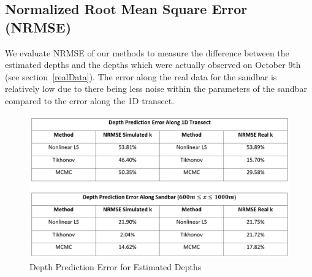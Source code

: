\subsection{Normalized Root Mean Square Error (NRMSE)}
We evaluate NRMSE of our methods to measure the difference between the estimated depths and the depths which were actually observed on October 9th (see section~\ref{realData}). The error along the real data for the sandbar is relatively low due to there being less noise within the parameters of the sandbar compared to the error along the 1D transect.

\begin{figure}[h]
		\centering
		\includegraphics[width=0.80\linewidth]{img/NRMSE_Chart.png}
		\caption{Depth Prediction Error for Estimated Depths}
\end{figure}
		